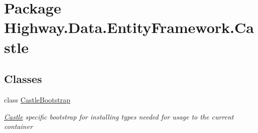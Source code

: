 \hypertarget{namespace_highway_1_1_data_1_1_entity_framework_1_1_castle}{\section{Package Highway.\-Data.\-Entity\-Framework.\-Castle}
\label{namespace_highway_1_1_data_1_1_entity_framework_1_1_castle}
}
\subsection*{Classes}
\begin{DoxyCompactItemize}
\item 
class \hyperlink{class_highway_1_1_data_1_1_entity_framework_1_1_castle_1_1_castle_bootstrap}{Castle\-Bootstrap}
\begin{DoxyCompactList}\small\item\em \hyperlink{namespace_highway_1_1_data_1_1_entity_framework_1_1_castle}{Castle} specific bootstrap for installing types needed for usage to the current container \end{DoxyCompactList}\end{DoxyCompactItemize}
